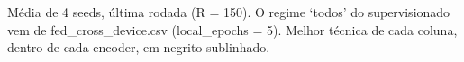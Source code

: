 \begin{table}[htbp]
\centering
\small
\caption{Cross-device: acurácia (\%) por encoder, federação e técnica --- rótulo cheio}
\label{tab:t3_crossdevice_encoder_federacao}

\par\vspace{2pt}\footnotesize Média de 4 seeds, última rodada (R = 150). O regime `todos' do supervisionado vem de fed\_cross\_device.csv (local\_epochs = 5). Melhor técnica de cada coluna, dentro de cada encoder, em negrito sublinhado.
\end{table}
